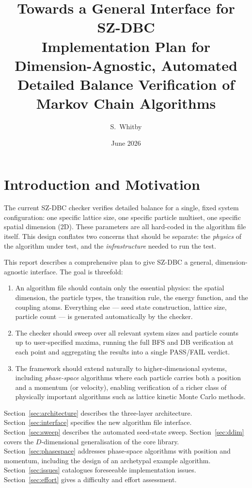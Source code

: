 \documentclass[12pt,a4paper]{article}
\title{\textbf{Towards a General Interface for SZ-DBC}\\[4pt]
\large Implementation Plan for Dimension-Agnostic, Automated\\
Detailed Balance Verification of Markov Chain Algorithms}
\author{S.~Whitby}
\date{June 2026}
\begin{document}
\maketitle
\tableofcontents
\newpage

\section{Introduction and Motivation}

The current SZ-DBC checker verifies detailed balance for a single, fixed system
configuration: one specific lattice size, one specific particle multiset, one
specific spatial dimension (2D). These parameters are all hard-coded in the
algorithm file itself. This design conflates two concerns that should be
separate: the \emph{physics} of the algorithm under test, and the
\emph{infrastructure} needed to run the test.

This report describes a comprehensive plan to give SZ-DBC a general,
dimension-agnostic interface. The goal is threefold:

\begin{enumerate}
  \item An algorithm file should contain only the essential physics: the spatial
    dimension, the particle types, the transition rule, the energy function, and
    the coupling atoms. Everything else --- seed state construction, lattice
    size, particle count --- is generated automatically by the checker.

  \item The checker should sweep over all relevant system sizes and particle
    counts up to user-specified maxima, running the full BFS and DB
    verification at each point and aggregating the results into a single
    PASS/FAIL verdict.

  \item The framework should extend naturally to higher-dimensional systems,
    including \emph{phase-space} algorithms where each particle carries both a
    position and a momentum (or velocity), enabling verification of a richer
    class of physically important algorithms such as lattice kinetic Monte
    Carlo methods.
\end{enumerate}

Section~\ref{sec:architecture} describes the three-layer architecture.
Section~\ref{sec:interface} specifies the new algorithm file interface.
Section~\ref{sec:sweep} describes the automated seed-state sweep.
Section~\ref{sec:ddim} covers the $D$-dimensional generalisation of the core
library.  Section~\ref{sec:phasespace} addresses phase-space algorithms with
position and momentum, including the design of an archetypal example algorithm.
Section~\ref{sec:issues} catalogues foreseeable implementation issues.
Section~\ref{sec:effort} gives a difficulty and effort assessment.
\end{document}
